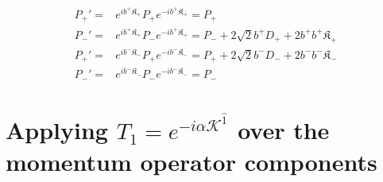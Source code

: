 \documentclass[]{article}
\numberwithin{equation}{section}
\def\wh{\widehat}
\begin{document}
{{\begin{align}
    {P}_{{+}}' = & e^{ib^{+} \mathfrak{K}_{+}} {P}_{{+}} e^{-ib^{+} \mathfrak{K}_{+} }={P}_{{+}} \\
    {P}_{{-}}' = & e^{ib^{+} \mathfrak{K}_{+}} {P}_{{-}} e^{-ib^{+} \mathfrak{K}_{+} }={P}_{{-}} + 2\sqrt{2}b^{+}D_{+} +2b^{+}b^{+} \mathfrak{K}_{+}\\
    {P}_{{+}}' = & e^{ib^{-} \mathfrak{K}_{-}} {P}_{{+}} e^{-ib^{-} \mathfrak{K}_{-} }={P}_{{+}} +2\sqrt{2}b^{-}D_{-}+2b^{-}b^{-} \mathfrak{K}_{-}\\
    {P}_{{-}}' = & e^{ib^{-} \mathfrak{K}_{-}} {P}_{{-}} e^{-ib^{-} \mathfrak{K}_{-} }={P}_{{-}} 
\end{align}




\section{Applying $T_1 = e^{-i\alpha {\mathcal K}^{\wh{1}} }$ over the momentum operator components}

}}
\end{document}
